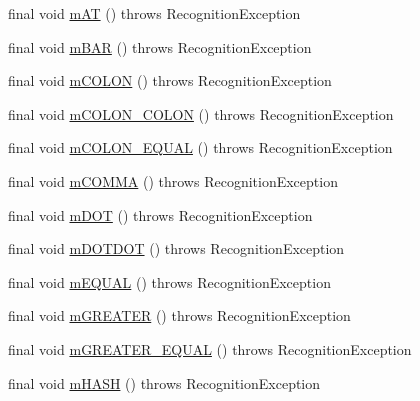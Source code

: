 \begin{DoxyCompactItemize}
final void \hyperlink{classorg_1_1tzi_1_1use_1_1parser_1_1soil_1_1_soil_lexer_affdcb7a4f0ce9ec99cfe815644977d21}{m\-A\-T} ()  throws Recognition\-Exception 
\item 
final void \hyperlink{classorg_1_1tzi_1_1use_1_1parser_1_1soil_1_1_soil_lexer_ad0764936d6103731babcc5d75da3c93a}{m\-B\-A\-R} ()  throws Recognition\-Exception 
\item 
final void \hyperlink{classorg_1_1tzi_1_1use_1_1parser_1_1soil_1_1_soil_lexer_a77709fba2ce87121f6facd37dd532435}{m\-C\-O\-L\-O\-N} ()  throws Recognition\-Exception 
\item 
final void \hyperlink{classorg_1_1tzi_1_1use_1_1parser_1_1soil_1_1_soil_lexer_ae891961b200442213d6edd077fa607b1}{m\-C\-O\-L\-O\-N\-\_\-\-C\-O\-L\-O\-N} ()  throws Recognition\-Exception 
\item 
final void \hyperlink{classorg_1_1tzi_1_1use_1_1parser_1_1soil_1_1_soil_lexer_a0a94df11f12711e0c9abbd6f982a76a2}{m\-C\-O\-L\-O\-N\-\_\-\-E\-Q\-U\-A\-L} ()  throws Recognition\-Exception 
\item 
final void \hyperlink{classorg_1_1tzi_1_1use_1_1parser_1_1soil_1_1_soil_lexer_a37a364411b7329436891ee355b370907}{m\-C\-O\-M\-M\-A} ()  throws Recognition\-Exception 
\item 
final void \hyperlink{classorg_1_1tzi_1_1use_1_1parser_1_1soil_1_1_soil_lexer_ae410e3c0f785c070b65d507af203a5eb}{m\-D\-O\-T} ()  throws Recognition\-Exception 
\item 
final void \hyperlink{classorg_1_1tzi_1_1use_1_1parser_1_1soil_1_1_soil_lexer_ae298511ca097abef3590f273f627af40}{m\-D\-O\-T\-D\-O\-T} ()  throws Recognition\-Exception 
\item 
final void \hyperlink{classorg_1_1tzi_1_1use_1_1parser_1_1soil_1_1_soil_lexer_a859ad4f3b3ec1b2b8574400d0e2c1e54}{m\-E\-Q\-U\-A\-L} ()  throws Recognition\-Exception 
\item 
final void \hyperlink{classorg_1_1tzi_1_1use_1_1parser_1_1soil_1_1_soil_lexer_a8ddcfd058dbe15cf15f483b23dfb03ad}{m\-G\-R\-E\-A\-T\-E\-R} ()  throws Recognition\-Exception 
\item 
final void \hyperlink{classorg_1_1tzi_1_1use_1_1parser_1_1soil_1_1_soil_lexer_aecee448f2ea8c2e43b6741490ac6c4d3}{m\-G\-R\-E\-A\-T\-E\-R\-\_\-\-E\-Q\-U\-A\-L} ()  throws Recognition\-Exception 
\item 
final void \hyperlink{classorg_1_1tzi_1_1use_1_1parser_1_1soil_1_1_soil_lexer_a24e66ab8b33f4c850c9f708bce73f793}{m\-H\-A\-S\-H} ()  throws Recognition\-Exception 
\item 

\end{DoxyCompactItemize}

